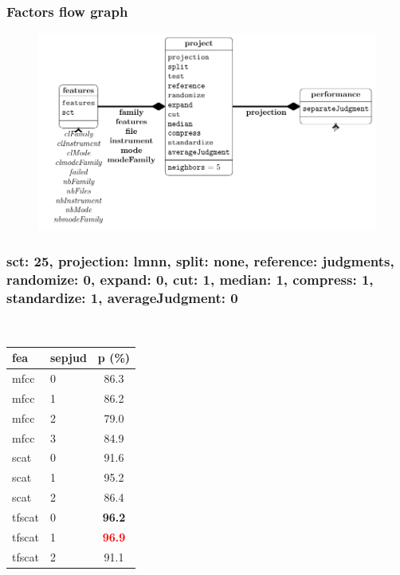   
 
  
  
\begin{frame}\frametitle{Factors flow graph} 
  
  
\begin{center} 
  
  
\begin{figure} 
  
  
\includegraphics[width=\textwidth,height=0.8\textheight,keepaspectratio]{../figures/factors.pdf} 
  
  
\label{factorFlowGraph} 
  
  
\end{figure} 
  
  
\end{center} 
  
  
\end{frame} 
  
\begin{frame}\frametitle{sct: 25, projection: lmnn, split: none, reference: judgments, randomize: 0, expand: 0, cut: 1, median: 1, compress: 1, standardize: 1, averageJudgment: 0} 
  
\begin{table} 
\begin{center} 
\ 
 \setlength{\tabcolsep}{.16667em} 
\begin{tabular}{llc} 
fea & sepjud & p (\%) \\ 
\hline 
mfcc & 0 & 86.3 \\ 
mfcc & 1 & 86.2 \\ 
mfcc & 2 & 79.0 \\ 
mfcc & 3 & 84.9 \\ 
scat & 0 & 91.6 \\ 
scat & 1 & 95.2 \\ 
scat & 2 & 86.4 \\ 
tfscat & 0 & \textbf{96.2} \\ 
tfscat & 1 & \textbf{\textcolor{red}{96.9}} \\ 
tfscat & 2 & 91.1 \\ 
\end{tabular} 
\end{center} 
\label{sc25PrlmSpnoRejuRa0Ex0Cu1Me1Co1St1Avju0} 
\end{table} 
 
\end{frame}  
